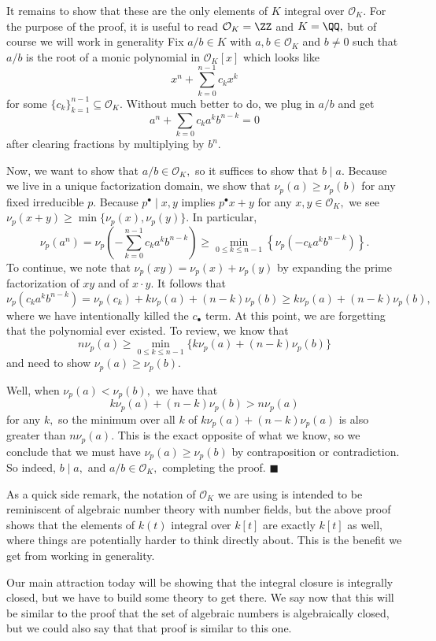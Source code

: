 It remains to show that these are the only elements of $K$ integral over $\mathcal O_K.$ For the purpose of the proof, it is useful to read $\mathcal O_K=\ZZ$ and $K=\QQ,$ but of course we will work in generality Fix $a/b\in K$ with $a,b\in\mathcal O_K$ and $b\ne0$ such that $a/b$ is the root of a monic polynomial in $\mathcal O_K[x]$ which looks like
\[x^n+\sum_{k=0}^{n-1}c_kx^k\]
for some $\{c_k\}_{k=1}^{n-1}\subseteq\mathcal O_K.$ Without much better to do, we plug in $a/b$ and get
\[a^n+\sum_{k=0}c_ka^kb^{n-k}=0\]
after clearing fractions by multiplying by $b^n.$

Now, we want to show that $a/b\in\mathcal O_K,$ so it suffices to show that $b\mid a.$ Because we live in a unique factorization domain, we show that $\nu_p(a)\ge\nu_p(b)$ for any fixed irreducible $p.$ Because $p^\bullet\mid x,y$ implies $p^\bullet x+y$ for any $x,y\in\mathcal O_K,$ we see $\nu_p(x+y)\ge\min\{\nu_p(x),\nu_p(y)\}.$ In particular,
\[\nu_p\left(a^n\right)=\nu_p\left(-\sum_{k=0}^{n-1}c_ka^kb^{n-k}\right)\ge\min_{0\le k\le n-1}\left\{\nu_p\left(-c_ka^kb^{n-k}\right)\right\}.\]
To continue, we note that $\nu_p(xy)=\nu_p(x)+\nu_p(y)$ by expanding the prime factorization of $xy$ and of $x\cdot y.$ It follows that
\[\nu_p\left(c_ka^kb^{n-k}\right)=\nu_p(c_k)+k\nu_p(a)+(n-k)\nu_p(b)\ge k\nu_p(a)+(n-k)\nu_p(b),\]
where we have intentionally killed the $c_\bullet$ term. At this point, we are forgetting that the polynomial ever existed. To review, we know that
\[n\nu_p(a)\ge\min_{0\le k\le n-1}\{k\nu_p(a)+(n-k)\nu_p(b)\}\]
and need to show $\nu_p(a)\ge\nu_p(b).$

Well, when $\nu_p(a)<\nu_p(b),$ we have that
\[k\nu_p(a)+(n-k)\nu_p(b)>n\nu_p(a)\]
for any $k,$ so the minimum over all $k$ of $k\nu_p(a)+(n-k)\nu_p(a)$ is also greater than $n\nu_p(a).$ This is the exact opposite of what we know, so we conclude that we must have $\nu_p(a)\ge\nu_p(b)$ by contraposition or contradiction. So indeed, $b\mid a,$ and $a/b\in\mathcal O_K,$ completing the proof. $\blacksquare$

As a quick side remark, the notation of $\mathcal O_K$ we are using is intended to be reminiscent of algebraic number theory with number fields, but the above proof shows that the elements of $k(t)$ integral over $k[t]$ are exactly $k[t]$ as well, where things are potentially harder to think directly about. This is the benefit we get from working in generality.

Our main attraction today will be showing that the integral closure is integrally closed, but we have to build some theory to get there. We say now that this will be similar to the proof that the set of algebraic numbers is algebraically closed, but we could also say that that proof is similar to this one.

